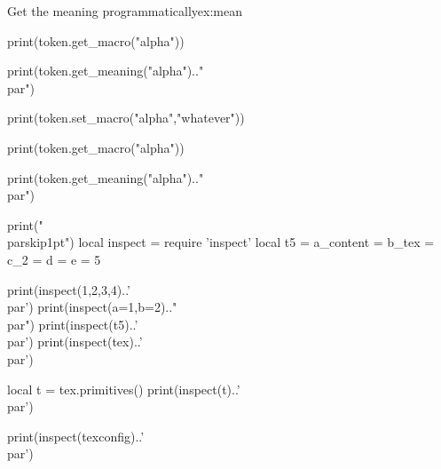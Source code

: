 \begin{texexample}{Get the meaning programmatically}{ex:mean}

\def\alpha#1#2{beta#1 gamma#2 delta}

\begin{luacode}
print(token.get_macro("alpha"))

print(token.get_meaning("alpha").."\\par")


print(token.set_macro("alpha","whatever"))

print(token.get_macro("alpha"))

print(token.get_meaning("alpha").."\\par")
\end{luacode}

\end{texexample}



\begin{luacode}
print("\\parskip1pt")
local inspect = require 'inspect'
local t5 = {a_content = {b_tex = {c_2 = {d = {e = 5}}}}}

print(inspect({1,2,3,4})..'\\par')
print(inspect({a=1,b=2}).."\\par")
print(inspect(t5)..'\\par') 
print(inspect(tex)..'\\par')

local t = tex.primitives()
print(inspect(t)..'\\par')

print(inspect(texconfig)..'\\par')
\end{luacode}

